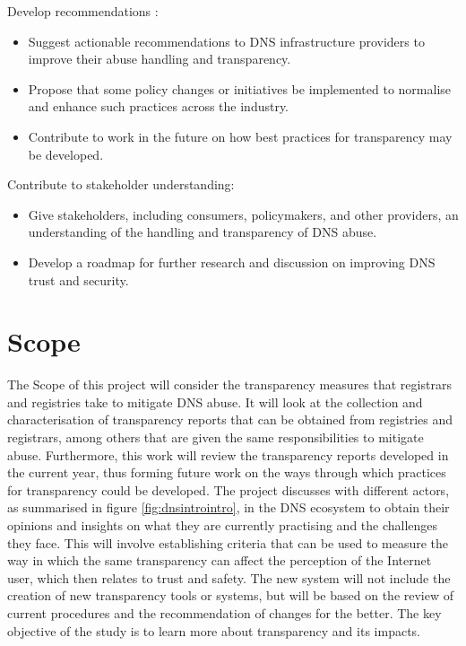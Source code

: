Develop recommendations :

\begin{itemize}
  \item Suggest actionable recommendations to DNS infrastructure providers to improve their abuse handling and transparency.
  \item Propose that some policy changes or initiatives be implemented to normalise and enhance such practices across the industry.
  \item Contribute to work in the future on how best practices for transparency may be developed.
\end{itemize}

Contribute to stakeholder understanding: 

\begin{itemize}
  \item Give stakeholders, including consumers, policymakers, and other providers, an understanding of the handling and transparency of DNS abuse.
  \item Develop a roadmap for further research and discussion on improving DNS trust and security.
\end{itemize}

\section{Scope}	
The Scope of this project will consider the transparency measures that registrars and registries take to mitigate DNS abuse. It will look at the collection and characterisation of transparency reports that can be obtained from registries and registrars, among others that are given the same responsibilities to mitigate abuse. Furthermore, this work will review the transparency reports developed in the current year, thus forming future work on the ways through which practices for transparency could be developed. The project discusses with different actors, as summarised in figure \ref{fig:dnsintrointro}, in the DNS ecosystem to obtain their opinions and insights on what they are currently practising and the challenges they face. This will involve establishing criteria that can be used to measure the way in which the same transparency can affect the perception of the Internet user, which then relates to trust and safety. The new system will not include the creation of new transparency tools or systems, but will be based on the review of current procedures and the recommendation of changes for the better. The key objective of the study is to learn more about transparency and its impacts.  

